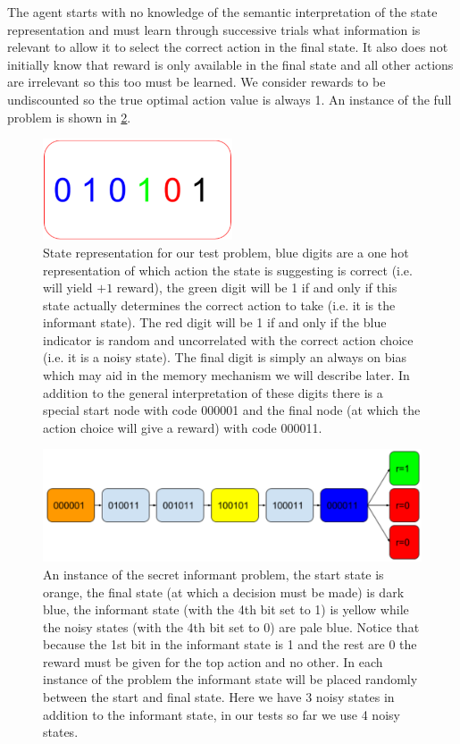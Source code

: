 \documentclass{article}
\begin{document}
The agent starts with no knowledge of the semantic interpretation of the state representation and must learn through successive trials what information is relevant to allow it to select the correct action in the final state. It also does not initially know that reward is only available in the final state and all other actions are irrelevant so this too must be learned. We consider rewards to be undiscounted so the true optimal action value is always 1.  An instance of the full problem is shown in \ref{fig:problem}.
\begin{figure}[!ht]
\center
\includegraphics[width=0.5\textwidth]{images/state.png}
\caption{State representation for our test problem, blue digits are a one hot representation of which action the state is suggesting is correct (i.e. will yield $+1$ reward), the green digit will be 1 if and only if this state actually determines the correct action to take (i.e. it is the informant state). The red digit will be 1 if and only if the blue indicator is random and uncorrelated with the correct action choice (i.e. it is a noisy state). The final digit is simply an always on bias which may aid in the memory mechanism we will describe later. In addition to the general interpretation of these digits there is a special start node with code 000001 and the final node (at which the action choice will give a reward) with code 000011.}
\label{fig:state}
\end{figure}

\begin{figure}[!ht]
\includegraphics[width=1\textwidth]{images/problem.png}
\caption{An instance of the secret informant problem, the start state is orange, the final state (at which a decision must be made) is dark blue, the informant state (with the 4th bit set to 1) is yellow while the noisy states (with the 4th bit set to 0) are pale blue. Notice that because the 1st bit in the informant state is 1 and the rest are 0 the reward must be given for the top action and no other. In each instance of the problem the informant state will be placed randomly between the start and final state. Here we have 3 noisy states in addition to the informant state, in our tests so far we use 4 noisy states.}
\label{fig:problem}
\end{figure}
\end{document}

